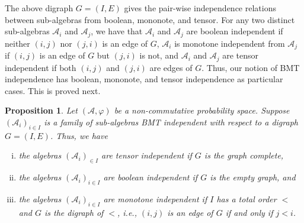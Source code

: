 \documentclass[a4paper,12pt]{extarticle}
\newtheorem{prop}[thm]{Proposition}
\theoremstyle{definition}
\theoremstyle{remark}
\def\AA{\mathcal{A}}
\begin{document}
The above digraph $G=(I,E)$ gives the pair-wise independence relations between sub-algebras from boolean, mononote, and tensor. 
%
For any two distinct sub-algebras $\AA_i$ and $\AA_j$, we have that 
%
$\AA_i$ and $\AA_j$ are boolean independent if neither $(i,j)$ nor $(j,i)$ is an edge of $G$, 
%
$\AA_i$ is monotone independent from $\AA_j$ if $(i,j)$ is an edge of $G$ but $(j,i)$ is not, and 
%
$\AA_i$ and $\AA_j$ are tensor independent if both $(i,j)$ and $(j,i)$ are edges of $G$. 
%
Thus, our notion of BMT independence has boolean, mononote, and tensor independence as particular cases. 
%
This is proved next. 
%
%
%
 
\begin{prop}\label{prop_BMT_generalizes}
	Let $(\mathcal{A},\varphi)$ be a non-commutative probability space. 
	Suppose $(\mathcal{A}_i)_{i \in I}$ is a family of sub-algebras BMT independent with respect to a digraph $G = (I,E)$. 
	Thus, we have
	\begin{enumerate}[(i)]
		\item the algebras $(\mathcal{A}_i)_{ \in I}$ are tensor independent if $G$ is the graph complete, 
		\item the algebras $(\mathcal{A}_i)_{i \in I}$ are boolean independent if $G$ is the empty graph, and   
		\item the algebras $(\mathcal{A}_i)_{i \in I}$ are monotone independent if $I$ has a total order $<$ and $G$ is the digraph of $<$, i.e., $(i,j)$ is an edge of $G$ if and only if $j < i$. 
	\end{enumerate}
\end{prop}
\end{document}
